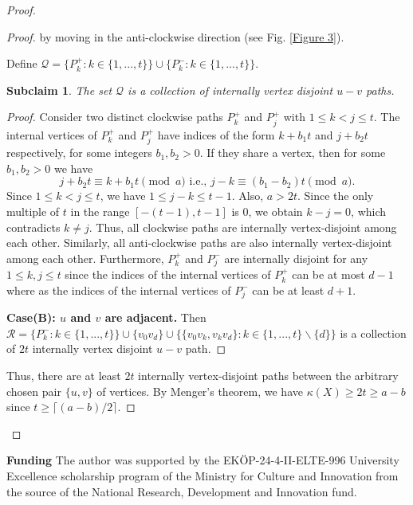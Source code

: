 \documentclass[12pt,reqno,a4paper]{amsart}
\theoremstyle{definition}
\newtheorem{subclaim}[defn]{Subclaim}
\begin{document}
\begin{proof}
\begin{proof}
by moving in the anti-clockwise direction (see Fig. \ref{Figure 3}).

Define $\mathcal{Q}=\{P_{k}^{+}:k\in\{1,...,t\}\}\cup \{P_{k}^{-}:k\in\{1,...,t\}\}$.

\begin{subclaim}\label{Subclaim 4.7}
    {\em The set $\mathcal{Q}$ is a collection of internally vertex disjoint $u-v$ paths.}
\end{subclaim}

\begin{proof}
Consider two distinct clockwise paths $P_k^+$ and $P_j^+$ with $1 \le k < j \le t$. The internal vertices of $P_k^+$ and $P_{j}^{+}$ have indices of the form $k + b_{1}t$ and $j + b_{2}t$ respectively, for some integers $b_{1}, b_{2} > 0$. If they share a vertex, then for some $b_{1}, b_{2}>0$ we have
\[ 
j+b_{2}t \equiv k+b_{1}t \pmod a \text{ i.e., } j-k \equiv (b_{1}-b_{2})t \pmod a. 
\]
Since $1 \le k < j \le t$, we have 
$1\leq j-k\leq t-1$. Also, $a > 2t$. Since the only multiple of $t$ in the range $[-(t-1), t-1]$ is $0$, we obtain $k-j=0$, which contradicts $k \ne j$. Thus, all clockwise paths are internally vertex-disjoint among each other. Similarly, all anti-clockwise paths are also internally vertex-disjoint among each other. 
Furthermore, $P_k^+$ and $P_j^-$ are internally disjoint for any $1 \le k, j \le t$ since the indices of the internal vertices of $P^{+}_{k}$ can be at most $d-1$ where as the indices of the internal vertices of $P^{-}_{j}$ can be at least $d+1$. 

\textbf{Case(B): $u$ and $v$ are adjacent.} Then $\mathcal{R}=\{P_{k}^{-}:k\in \{1,...,t\}\}\cup \{v_{0}v_{d}\}\cup \{\{v_{0}v_{k},v_{k}v_{d}\}:k\in \{1,...,t\}\backslash \{d\}\}$ is a collection of $2t$ internally vertex disjoint $u-v$ path.
\end{proof}

Thus, there are at least $2t$ internally vertex-disjoint paths between the arbitrary chosen pair $\{u,v\}$ of vertices. By Menger's theorem, we have $\kappa(X)\ge 2t\geq a-b$ since $t\ge\lceil(a-b)/2\rceil$. 
\end{proof}

\end{proof}
\textbf{Funding} The author was supported by the EK\"{O}P-24-4-II-ELTE-996 University Excellence scholarship program of the Ministry for Culture and Innovation from the source of the National Research, Development and Innovation fund. 
\end{document}
